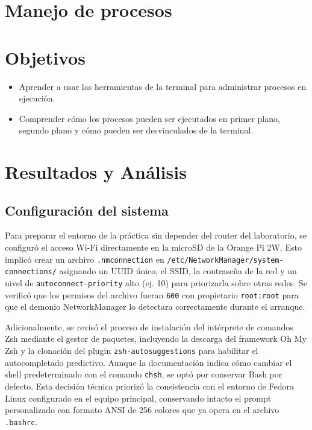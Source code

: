 \documentclass[12pt, letterpaper]{article}
\begin{document}



\normalsize

\section*{\centering \fontsize{14}{17}\sffamily\selectfont Manejo de procesos}

\section*{\centering \fontsize{14}{17}\sffamily\selectfont Objetivos}

\begin{itemize}
	\item Aprender a usar las herramientas de la terminal para administrar procesos en ejecución.
	\item Comprender cómo los procesos pueden ser ejecutados en primer plano, segundo plano y cómo pueden ser desvinculados de la terminal.
\end{itemize}

\section*{\centering \fontsize{14}{17}\sffamily\selectfont Resultados y Análisis}

\subsection*{\fontsize{12}{17}\sffamily\selectfont Configuración del sistema}

Para preparar el entorno de la práctica sin depender del router del laboratorio, se configuró el acceso Wi-Fi directamente en la microSD de la Orange Pi 2W. Esto implicó crear un archivo \texttt{.nmconnection} en \texttt{/etc/NetworkManager/system-connections/} asignando un UUID único, el SSID, la contraseña de la red y un nivel de \texttt{autoconnect-priority} alto (ej. 10) para priorizarla sobre otras redes. Se verificó que los permisos del archivo fueran \texttt{600} con propietario \texttt{root:root} para que el demonio NetworkManager lo detectara correctamente durante el arranque.

Adicionalmente, se revisó el proceso de instalación del intérprete de comandos Zsh mediante el gestor de paquetes, incluyendo la descarga del framework Oh My Zsh y la clonación del plugin \texttt{zsh-autosuggestions} para habilitar el autocompletado predictivo. Aunque la documentación indica cómo cambiar el shell predeterminado con el comando \texttt{chsh}, se optó por conservar Bash por defecto. Esta decisión técnica priorizó la consistencia con el entorno de Fedora Linux configurado en el equipo principal, conservando intacto el prompt personalizado con formato ANSI de 256 colores que ya opera en el archivo \texttt{.bashrc}.
\end{document}
